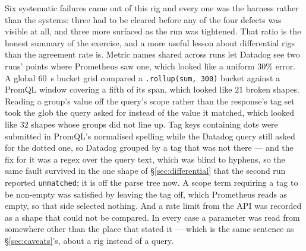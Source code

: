 \begin{remark}\label{rem:harness-failures}
Six systematic failures came out of this rig and every one was the harness rather than
the systems: three had to be cleared before any of the four defects was visible at all,
and three more surfaced as the run was tightened. That ratio is the honest summary of
the exercise, and a more useful lesson about differential rigs than the agreement rate
is. Metric names shared across runs let Datadog see two runs' points where Prometheus
saw one, which looked like a uniform $30\%$ error. A global $60$~s bucket grid compared
a \texttt{.rollup(sum, 300)} bucket against a PromQL window covering a fifth of its
span, which looked like $21$ broken shapes. Reading a group's value off the query's
scope rather than the response's tag set took the glob the query asked for instead of
the value it matched, which looked like $32$ shapes whose groups did not line up. Tag
keys containing dots were submitted in PromQL's normalised spelling while the Datadog
query still asked for the dotted one, so Datadog grouped by a tag that was not there ---
and the fix for it was a regex over the query text, which was blind to hyphens, so the
same fault survived in the one shape of \S\ref{sec:differential} that the second run
reported \texttt{unmatched}; it is off the parse tree now. A
scope term requiring a tag to be non-empty was satisfied by leaving the tag off, which
Prometheus reads as empty, so that side selected nothing. And a rate limit from the API
was recorded as a shape that could not be compared. In every case a parameter was read
from somewhere other than the place that stated it --- which is the same sentence as
\S\ref{sec:caveats}'s, about a rig instead of a query.
\end{remark}
